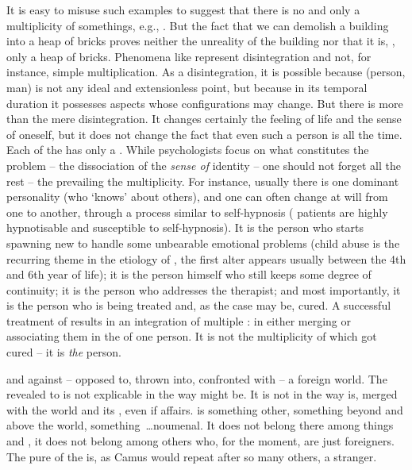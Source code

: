 \pa\label{pa:iDID}
It is easy to misuse such examples to suggest that  there is
no  and only a multiplicity of somethings, e.g., . But the fact
that we can demolish a building into a heap of bricks proves neither the
unreality of the building nor that it is, , only a heap of
bricks. Phenomena like  represent disintegration and not, 
for instance, simple multiplication. As a disintegration, it is possible because
 (person, man) is not any ideal and extensionless point, but
because in its temporal duration it possesses  aspects whose
configurations may change.
But there is more than the mere disintegration. 
It changes certainly the feeling of life and the
sense of oneself, but it does not change the fact that even such a person is
 all the time.  Each of the  has only a .  While psychologists focus on what constitutes the
problem -- the dissociation of the {\em sense of} identity -- one should not
forget all the rest -- the  prevailing  the  multiplicity.
For instance, usually there is one dominant personality (who `knows' about
others), and one 
can often change at will from one to another, through a process similar to
self-hypnosis ( patients are highly hypnotisable and susceptible to
self-hypnosis).  It is the person  who starts spawning new 
to handle some unbearable emotional problems (child abuse is the recurring
theme in the etiology of , the first alter  appears usually between
the 4th and 6th year of life); it is the person himself who
still keeps some degree of continuity; it is the person  who addresses the therapist; and most
importantly, it is the person  who is being treated and, as the case
may be, cured. A successful treatment of  
results in an integration of multiple : in either merging or
associating them in the  of one
person. It is not the multiplicity of  which got cured -- it is {\em
  the} person.



\pa
{} and  against -- opposed to, thrown
into, confronted with -- a foreign world.  The  revealed to
 is not explicable in the way  might be. It is not
 in the way  is, merged with the world and its
, even if  affairs.  is something other, something
beyond and above the world, something~\ldots noumenal.  It does not belong there
among things and , it does not belong among others who, for the
moment, are just foreigners. The pure  of the 
is, as Camus would repeat after so many others, a stranger.

